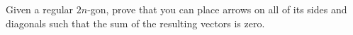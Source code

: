 Given a regular $2n$-gon, prove that you can place arrows on all of its sides and diagonals such that the sum of the resulting vectors is zero.
